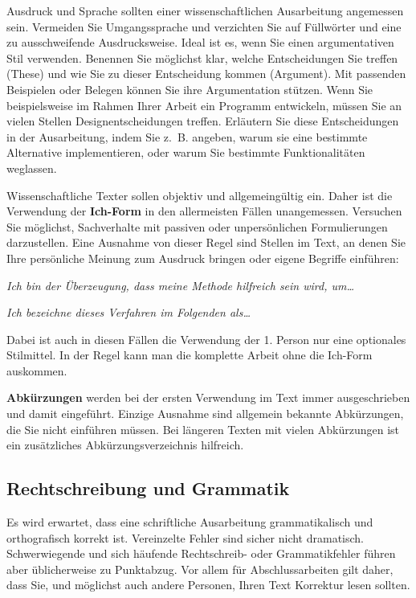Ausdruck und Sprache sollten einer wissenschaftlichen Ausarbeitung angemessen sein.
Vermeiden Sie Umgangssprache und verzichten Sie auf Füllwörter und eine zu ausschweifende Ausdrucksweise.
Ideal ist es, wenn Sie einen argumentativen Stil verwenden.
Benennen Sie möglichst klar, welche Entscheidungen Sie treffen (These) und wie Sie zu dieser Entscheidung kommen (Argument).
Mit passenden Beispielen oder Belegen können Sie ihre Argumentation stützen.
Wenn Sie beispielsweise im Rahmen Ihrer Arbeit ein Programm entwickeln, müssen Sie an vielen Stellen Designentscheidungen treffen.
Erläutern Sie diese Entscheidungen in der Ausarbeitung, indem Sie z.~B. angeben, warum sie eine bestimmte Alternative implementieren, oder warum Sie bestimmte Funktionalitäten weglassen.

Wissenschaftliche Texter sollen objektiv und allgemeingültig ein.
Daher ist die Verwendung der \textbf{Ich-Form} in den allermeisten Fällen unangemessen.
Versuchen Sie möglichst, Sachverhalte mit passiven oder unpersönlichen Formulierungen darzustellen.
Eine Ausnahme von dieser Regel sind Stellen im Text, an denen Sie Ihre persönliche Meinung zum Ausdruck bringen oder eigene Begriffe einführen:
\begin{compactitem}
\item \textit{\glqq{}Ich bin der Überzeugung, dass meine Methode hilfreich sein wird, um\dots\grqq{}}
\item \textit{\glqq{}Ich bezeichne dieses Verfahren im Folgenden als\dots\grqq{}}
\end{compactitem}
Dabei ist auch in diesen Fällen die Verwendung der 1. Person nur eine optionales Stilmittel.
In der Regel kann man die komplette Arbeit ohne die Ich-Form auskommen.


\textbf{Abkürzungen} werden bei der ersten Verwendung im Text immer ausgeschrieben und damit eingeführt.
Einzige Ausnahme sind allgemein bekannte Abkürzungen, die Sie nicht einführen müssen.
Bei längeren Texten mit vielen Abkürzungen 	ist ein zusätzliches Abkürzungsverzeichnis hilfreich.




\subsection{Rechtschreibung und Grammatik}

Es wird erwartet, dass eine schriftliche Ausarbeitung grammatikalisch und orthografisch korrekt ist.
Vereinzelte Fehler sind sicher nicht dramatisch.
Schwerwiegende und sich häufende Rechtschreib- oder Grammatikfehler führen aber üblicherweise zu Punktabzug.
Vor allem für Abschlussarbeiten gilt daher, dass Sie, und möglichst auch andere Personen,  Ihren Text Korrektur lesen sollten.



